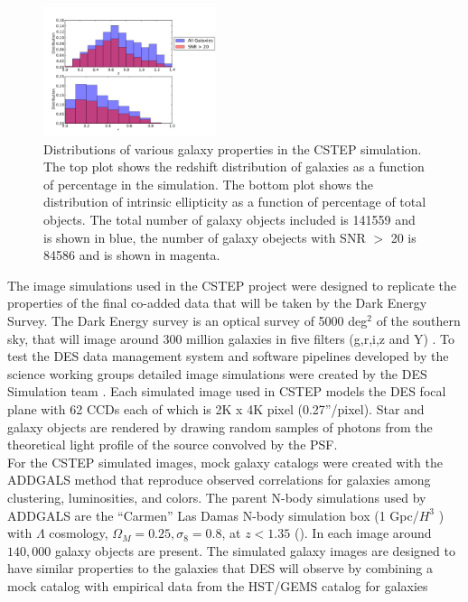 \begin{figure}
 \centering  %
  \includegraphics[width=0.45\textwidth]{fig/Out_hist_v2_truth.pdf} 
  \caption{Distributions of various galaxy 
properties in the CSTEP simulation. The top plot shows the
redshift distribution of galaxies as a function of percentage in the simulation. 
The bottom plot shows the distribution of intrinsic ellipticity as a
function of percentage of total objects. The
total number of galaxy objects included is 141559 and is shown in blue, the number of
galaxy obejects with SNR $>$ 20 is 84586 and is shown in magenta.}
\label{fig:Galprop}
\end{figure}
The image simulations used in the CSTEP project were designed to 
replicate the properties of the final co-added data that will be taken by the 
Dark Energy Survey. The Dark Energy survey is an optical survey of
5000 deg$^2$ of the southern sky, that will image around 300 million
galaxies in five filters (g,r,i,z and Y) \citep{Klaus}. To test the DES
data management system and software pipelines developed by the 
science working groups detailed image simulations were created by the 
DES Simulation team \citep{DESsim}. Each simulated image used in CSTEP models the DES focal plane
with 62 CCDs each of which is 2K x 4K pixel (0.27''/pixel). Star and galaxy objects are
rendered by drawing random samples of
photons from the theoretical light profile of the source convolved 
by the PSF. \\
\indent For the CSTEP simulated images, mock galaxy catalogs were
created with the ADDGALS  method that reproduce observed correlations
for galaxies among clustering, luminosities, and colors. 
The parent N-body simulations used by ADDGALS are the ``Carmen'' Las Damas
N-body simulation box (1 Gpc/$H^3$ ) with  $ \Lambda$ cosmology, $\Omega_M
= 0.25, \sigma_8 = 0.8$, at $z< 1.35 $
(\cite{LasDamas}). In each image around $ 140,000 $ galaxy objects are
present. The simulated galaxy images are designed to have similar properties to
the galaxies that DES will observe by combining a mock
catalog with empirical data from the HST/GEMS catalog for galaxies

